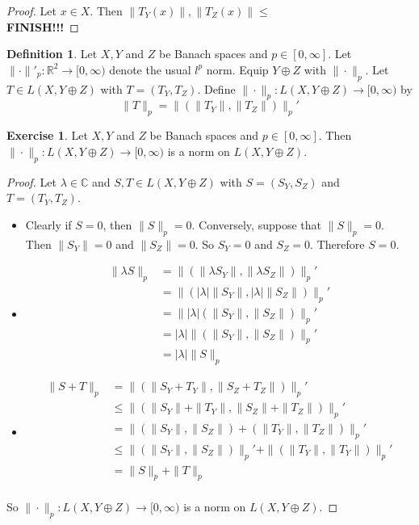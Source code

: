 \documentclass[12pt]{amsart}
\theoremstyle{definition}
\newtheorem{defn}[definition]{Definition}
\newtheorem{ex}[definition]{Exercise}
\newcommand{\lam}{\lambda}
\newcommand{\C}{\mathbb{C}}
\newcommand{\R}{\mathbb{R}}
\newcommand{\Rg}{[0,\infty)}
\begin{document}
	\begin{proof}
	Let $x \in X$. Then $\|T_Y(x)\|, \|T_Z(x)\| \leq $
	\\ \textbf{FINISH!!!}
	\end{proof}

	\begin{defn}
	Let $X, Y$ and $Z$ be Banach spaces and $p \in [0, \infty]$. Let $\| \cdot \|'_p: \R^2 \rightarrow [0, \infty)$ denote the usual $l^p$ norm. Equip $Y \oplus Z$ with $\|\cdot\|_p$. Let $T \in L(X, Y \oplus Z)$ with $T = (T_Y, T_Z)$. Define $\|\cdot \|_p: L(X, Y \oplus Z) \rightarrow \Rg$ by $$\|T\|_p = \|(\|T_Y\|, \|T_Z\|)\|_p'$$
	\end{defn}
	
	\begin{ex}
	Let $X, Y$ and $Z$ be Banach spaces and $p \in [0, \infty]$. Then $\|\cdot \|_p: L(X, Y \oplus Z) \rightarrow \Rg$ is a norm on $L(X, Y \oplus Z)$. 
	\end{ex}
	
	\begin{proof}
	Let $\lam \in \C$ and $S, T \in L(X, Y \oplus Z)$ with $S= (S_Y, S_Z)$ and $T = (T_Y, T_Z)$. 
	\begin{itemize}
	\item Clearly if $S = 0$, then $\|S\|_p = 0$. Conversely, suppose that $\|S\|_p = 0$. Then $\|S_Y\| = 0$ and $\|S_Z\| = 0$. So $S_Y = 0$ and $S_Z = 0$. Therefore $S = 0$. 
	\item 
	\begin{align*}
	\|\lam S\|_p
	&= \|(\|\lam S_Y\|, \|\lam S_Z\|)\|_p' \\
	&= \|(|\lam|\| S_Y\|, |\lam|\|S_Z \|)\|_p' \\
	&= \||\lam| (\| S_Y\|,\|S_Z\| )\|_p' \\
	&= |\lam| \|(\| S_Y\|,\|S_Z\|)\|_p' \\
	&= |\lam| \| S\|_p
	\end{align*}
	\item 
	\begin{align*}
	\|S + T\|_p
	&= \|(\|S_Y + T_Y\|, \|S_Z + T_Z\|)\|_p' \\
	&\leq \|(\|S_Y\| + \|T_Y\|, \|S_Z\| + \|T_Z\|)\|_p' \\
	&= \|(\|S_Y\|, \|S_Z\|) + (\|T_Y\|, \|T_Z\|)\|_p' \\
	&\leq \|(\|S_Y\|, \|S_Z\|)\|_p' + \|(\|T_Y\|, \|T_Y\|)\|_p' \\
	&= \|S\|_p + \|T\|_p \\ 
	\end{align*}
	\end{itemize}
	So $\|\cdot \|_p: L(X, Y \oplus Z) \rightarrow \Rg$ is a norm on $L(X, Y \oplus Z)$. 
	\end{proof}
	
\end{document}
